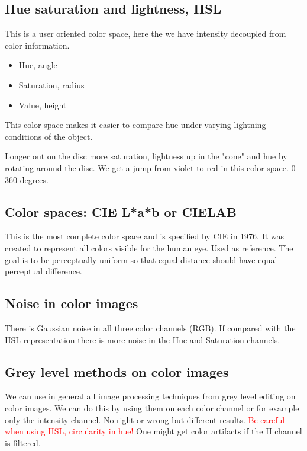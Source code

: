 \subsection*{Hue saturation and lightness, HSL}
This is a user oriented color space, here the we have intensity decoupled from color information. 

\begin{itemize}
	\item Hue, angle
	\item Saturation, radius
	\item Value, height
\end{itemize}

This color space makes it easier to compare hue under varying lightning conditions of the object. 

\begin{wbox}{}
Longer out on the disc more saturation, lightness up in the "cone" and hue by rotating around the disc. We get a jump from violet to red in this color space. 0-360 degrees.
\end{wbox}


\subsection*{Color spaces: CIE L*a*b or CIELAB}
This is the most complete color space and is specified by CIE in 1976. It was created to represent all colors visible for the human eye. Used as reference. The goal is to be perceptually uniform so that equal distance should have equal perceptual difference. 

\subsection*{Noise in color images}
There is Gaussian noise in all three color channels (RGB). If compared with the HSL representation there is more noise in the Hue and Saturation channels.


\subsection*{Grey level methods on color images}
We can use in general all image processing techniques from grey level editing on color images.  We can do this by using them on each color channel or for example only the intensity channel. No right or wrong but different results. \textcolor{red}{Be careful when using HSL, circularity in hue!} One might get color artifacts if the H channel is filtered.

